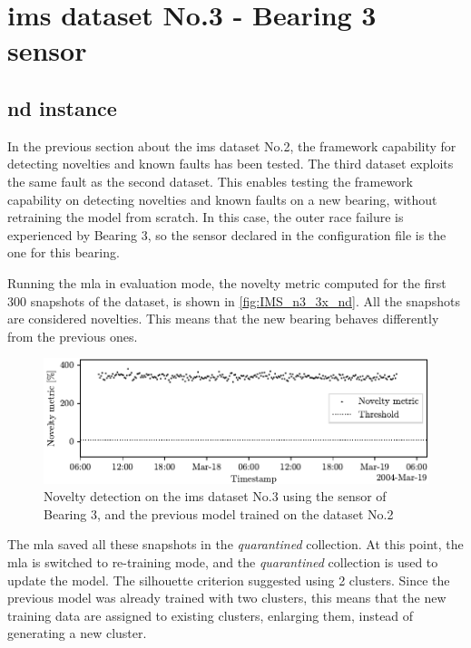 \section{\gls{ims} dataset No.3 - Bearing 3 sensor}
\label{sec:IMS_n3_3x}

\subsection{\gls{nd} instance}

In the previous section about the \gls{ims} dataset No.2, the framework capability for detecting novelties and known faults has been tested. The third dataset exploits the same fault as the second dataset. This enables testing the framework capability on detecting novelties and known faults on a new bearing, without retraining the model from scratch. In this case, the outer race failure is experienced by Bearing 3, so the sensor declared in the configuration file is the one for this bearing.

Running the \gls{mla} in evaluation mode, the novelty metric computed for the first 300 snapshots of the dataset, is shown in \autoref{fig:IMS_n3_3x_nd}. All the snapshots are considered novelties. This means that the new bearing behaves differently from the previous ones. 

\begin{figure}
    \centering
    \includegraphics{images/IMS/Test03/retrain.pdf}
    \caption{Novelty detection on the \gls{ims} dataset No.3 using the sensor of Bearing 3, and the previous model trained on the dataset No.2}
    \label{fig:IMS_n3_3x_nd}
\end{figure}

The \gls{mla} saved all these snapshots in the \emph{quarantined} collection. At this point, the \gls{mla} is switched to re-training mode, and the \emph{quarantined} collection is used to update the model. The silhouette criterion suggested using 2 clusters. Since the previous model was already trained with two clusters, this means that the new training data are assigned to existing clusters, enlarging them, instead of generating a new cluster. 

